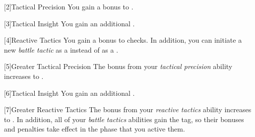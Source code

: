         [2]{Tactical Precision} You gain a  bonus to .

        [3]{Tactical Insight} You gain an additional .

        [4]{Reactive Tactics} You gain a  bonus to  checks.
        In addition, you can initiate a new \textit{battle tactic} as a  instead of as a .

        [5]{Greater Tactical Precision} The bonus from your \textit{tactical precision} ability increases to .

        [6]{Tactical Insight} You gain an additional .

        [7]{Greater Reactive Tactics} The bonus from your \textit{reactive tactics} ability increases to .
        In addition, all of your \textit{battle tactics} abilities gain the  tag, so their bonuses and penalties take effect in the phase that you active them.

\newpage
